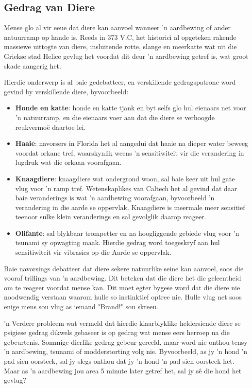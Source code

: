 \label{m38779*eip-745}
\subsection*{Gedrag van Diere}
\nopagebreak
Mense glo al vir eeue dat diere kan aanvoel wanneer 'n aardbewing of ander natuurramp op hande is. Reeds in 373 V.C, het historici al opgeteken rakende massiewe uittogte van diere, insluitende rotte, slange en meerkatte wat uit die Griekse stad Helice gevlug het voordat dit deur 'n aardbewing getref is, wat groot skade aangerig het.  \par 
Hierdie onderwerp is al baie gedebatteer, en verskillende gedragspatrone word gevind by verskillende diere, byvoorbeeld: \par 
\begin{itemize}[noitemsep]
\item \textbf{Honde en katte}: honde en katte tjank en byt selfs glo hul eienaars net voor 'n natuurramp, en die eienaars voer aan dat die diere se verhoogde reukvermo\"e daartoe lei.
\item \textbf{Haaie}: navorsers in Florida het al aangedui dat haaie na dieper water beweeg voordat orkane tref, waarskynlik weens 'n sensitiwiteit vir die verandering in lugdruk wat die orkaan voorafgaan. 
\item \textbf{Knaagdiere}: knaagdiere wat ondergrond woon, sal baie keer uit hul gate vlug voor 'n ramp tref. Wetenskaplikes van Caltech het al gevind dat daar baie veranderings is wat 'n aardbewing voorafgaan, byvoorbeeld 'n verandering in die aarde se oppervlak. Knaagdiere is meermale meer sensitief teenoor sulke klein veranderings en sal gevolglik daarop reageer. 
\item \textbf{Olifante}: sal blykbaar trompetter en na hoogliggende gebiede vlug voor 'n tsunami sy opwagting maak. Hierdie gedrag word toegeskryf aan hul sensitiwiteit vir vibrasies op die Aarde se oppervlak. \end{itemize}
Baie navorsings debatteer dat diere sekere natuurlike seine kan aanvoel, soos die vooraf trillings van 'n aardbewing. Dit beteken dat die diere het die geleentheid om te reageer voordat mense kan. Dit moet egter bygese word dat die diere nie noodwendig verstaan waarom hulle so instinktief optree nie. Hulle vlug net soos enige mens sou vlug as iemand "Brand!" sou skreeu. \par 
'n Verdere probleem wat vermeld dat hierdie klaarblyklike heldersiende diere se psigiese gedrag dikwels gebaseer is op gedrag wat mense eers herroep na die gebeurtenis. Sommige dierlike gedrag gebeur gereeld, maar word nie onthou tensy 'n aardbewing, tsunami of modderstorting volg nie. Byvoorbeeld, as jy 'n hond 'n pad sien oorsteek, sal jy slegs onthou dat jy 'n hond 'n pad sien oorsteek het. Maar as 'n aardbewing jou area 5 minute later getref het, sal jy s\^e die hond het gevlug?  \par 
